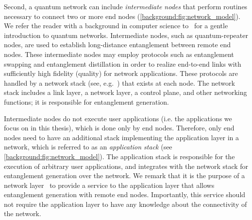 Second, a quantum network can include \emph{intermediate nodes} that perform routines necessary to connect two or more end nodes (\cref{background:fig:network_model}).
We refer the reader with a background in computer science to~\cite{vanMeter_book} for a gentle introduction to quantum networks. 
Intermediate nodes, such as quantum-repeater nodes, are used to establish long-distance entanglement between remote end nodes.
These intermediate nodes may employ protocols such as entanglement swapping and entanglement distillation in order to realize end-to-end links with sufficiently high fidelity (quality) for network applications.
These protocols are handled by a network stack (see, e.g.~\cite{dahlberg_2019_egp}) that exists at each node.
The network stack includes a link layer, a network layer, a control plane, and other networking functions; it is responsible for entanglement generation.

Intermediate nodes do not execute user applications (i.e. the applications we focus on in this thesis), which is done only by end nodes. 
Therefore, only end nodes need to have an additional stack implementing the application layer in a network, which is referred to as an \emph{application stack} (see \cref{background:fig:network_model}).
The application stack is responsible for the execution of arbitrary user applications, and integrates with the network stack for entanglement generation over the network.
We remark that it is the purpose of a network layer~\cite{dahlberg_2019_egp, kozlowski_2020_qnp} to provide a service to the application layer that allows entanglement generation with remote end nodes.
Importantly, this service should not require the application layer to have any knowledge about the connectivity of the network.

